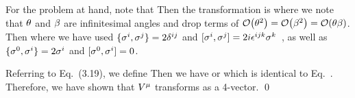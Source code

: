 {	For the problem at hand, note that
	Then the transformation is
	where we note that $\theta$ and $\beta$ are infinitesimal angles and drop terms of $\order{\tht^2} = \order{\bet^2} = \order{\tht \bet}$.  Then
	where we have used $\{ \sigma^i, \sigma^j \} = 2 \delta^{i j}$ and $[\sigma^i, \sigma^j] = 2i \epsilon^{i j k} \sigma^k$~\cite[p.~165]{Sakurai}, as well as $\{ \sigma^0, \sigma^i \} = 2 \sigma^i$ and ${[\sigma^0, \sigma^i] = 0}$.
	
	Referring to Eq.~(3.19), we define
	Then we have
	\al{
		\Vsm \sigm &\to \Vsm \sigm + \Vso \omgoi \sigsi - \Vsi \omgoi - \Vsj \omgij \sigj
		= \Vsm \sigm + \Vo \omgsoi \sigi - \Vi \omgsoi \sigo + \Vj \omgsij \sigj \\
		&= \Vsm \sigm + \Vo \omgsom \sigm + \Vi \omgsio \sigo + \Vj \omgsij \sigj
		= \Vsm \sigm + \Vn \omgsnm \sigm
		= (\delnsm + \omgnsm) \Vsn \sigm
	}
	or
	\eq{
		\Va \sigsa \to (\delasb + \omgasb) \Vb \sigsa
		\qimplies
		\ans{ \Va \to (\delasb + \omgasb) \Vb, }
	}
	which is identical to Eq.~.  Therefore, we have shown that $V^\mu$ transforms as a 4-vector. \qed
}